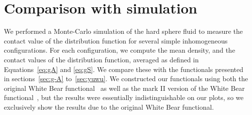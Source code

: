 



\section{Comparison with simulation}\label{sec:comparison}

We performed a Monte-Carlo simulation of the hard sphere fluid to
measure the contact value of the distribution function for several
simple inhomogeneous configurations.  For each configuration, we
compute the mean density, and the contact values of the distribution
function, averaged as defined in Equations~\ref{eq:gA} and
\ref{eq:gS}.  We compare these with the functionals presented in
sections~\ref{sec:g-A} to~\ref{sec:yuwu}.  We constructed our
functionals using both the original White Bear
functional~\cite{roth2002whitebear} as well as the mark II version of
the White Bear functional~\cite{hansen2006density}, but the results
were essentially indistinguishable on our plots, so we exclusively
show the results due to the original White Bear functional.

